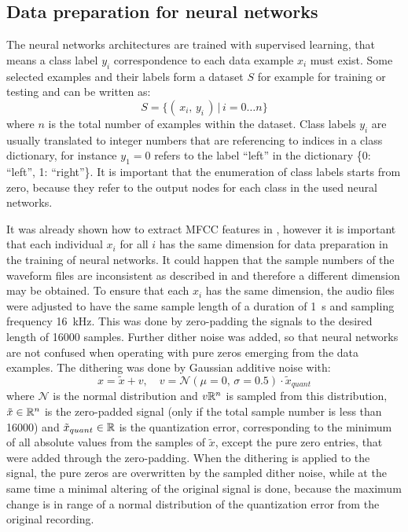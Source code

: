 
\subsection{Data preparation for neural networks}\label{sec:exp_data_prep}
The neural networks architectures are trained with supervised learning, that means a class label $y_i$ correspondence to each data example $x_i$ must exist.
Some selected examples and their labels form a dataset $S$ for example for training or testing and can be written as:
\begin{equation}\label{eq:exp_dataset}
  S = \{ (\,x_i, \, y_i\,) \, | \, i = 0 \dots n \}
\end{equation}
where $n$ is the total number of examples within the dataset.
Class labels $y_i$ are usually translated to integer numbers that are referencing to indices in a class dictionary, for instance $y_1 = 0$ refers to the label \enquote{left} in the dictionary \{0: \enquote{left}, 1: \enquote{right}\}.
It is important that the enumeration of class labels starts from zero, because they refer to the output nodes for each class in the used neural networks.

It was already shown how to extract MFCC features in , however it is important that each individual $x_i$ for all $i$ has the same dimension for data preparation in the training of neural networks.
It could happen that the sample numbers of the waveform files are inconsistent as described in  and therefore a different dimension may be obtained.
To ensure that each $x_i$ has the same dimension, the audio files were adjusted to have the same sample length of a duration of \SI{1}{\second} and sampling frequency \SI{16}{\kilo\hertz}.
This was done by zero-padding the signals to the desired length of 16000 samples.
Further dither noise was added, so that neural networks are not confused when operating with pure zeros emerging from the data examples.
The dithering was done by Gaussian additive noise with:
\begin{equation}\label{eq:exp_dither}
  x = \tilde{x} + v, \quad v = \mathcal{N}(\mu=0, \, \sigma=0.5) \cdot \tilde{x}_{quant}%
\end{equation}
where $\mathcal{N}$ is the normal distribution and $v \mathbb{R}^n$ is sampled from this distribution, $\tilde{x} \in \mathbb{R}^n$ is the zero-padded signal (only if the total sample number is less than 16000) and $\tilde{x}_{quant} \in \mathbb{R}$ is the quantization error, corresponding to the minimum of all absolute values from the samples of $\tilde{x}$, except the pure zero entries, that were added through the zero-padding.
When the dithering is applied to the signal, the pure zeros are overwritten by the sampled dither noise, while at the same time a minimal altering of the original signal is done, because the maximum change is in range of a normal distribution of the quantization error from the original recording.

